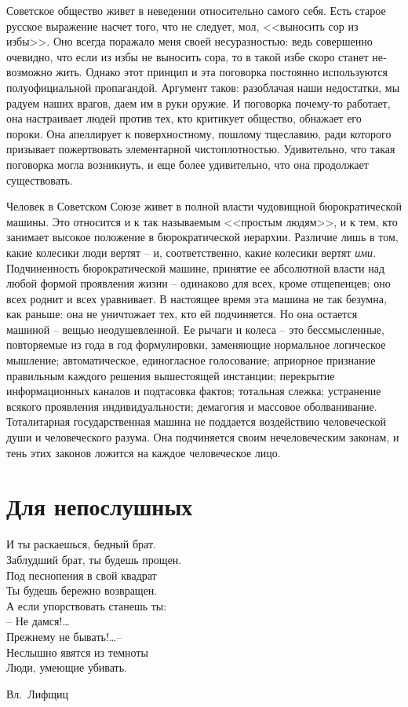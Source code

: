 \documentclass{book}
\begin{document}
Советское общество живет в неведении относительно самого себя. Есть старое русское выражение насчет того, что не следует, мол, 
<<выносить сор из избы>>. Оно всегда поражало меня своей несуразностью: ведь совершенно очевидно, что если из избы не выносить 
сора, то в такой избе скоро станет не­возможно жить. Однако этот принцип и эта поговорка постоянно используются полуофициальной 
пропагандой. Аргумент таков: разоблачая наши недостатки, мы радуем наших врагов, даем им в руки оружие. И поговорка почему-то 
работает, она настраивает людей против тех, кто критикует общество, обнажает его пороки. Она апеллирует к поверхностному, 
пошлому тщеславию, ради которого призывает пожертвовать элементарной чистоплотностью. Удивительно, что такая поговорка могла 
возникнуть, и еще более удивительно, что она продолжает существовать.

Человек в Советском Союзе живет в полной власти чудовищной бюрократической машины. Это относится и к так называемым <<простым 
людям>>, и к тем, кто занимает высокое положение в бюрократической иерархии. Различие лишь в том, какие колесики люди вертят -- 
и, соответственно, какие колесики вертят \textit{ими.}  Подчиненность бюрократической машине, принятие ее абсолютной власти над 
любой формой проявления жизни -- одинаково для всех, кроме отщепенцев; оно всех роднит и всех уравнивает. В настоящее время эта 
машина не так безумна, как раньше: она не уничтожает тех, кто ей подчиняется. Но она остается машиной -- вещью неодушевленной. 
Ее рычаги и колеса -- это бессмысленные, повторяемые из года в год формулировки, заменяющие нормальное логическое мышление; 
автоматическое, единогласное голосование; априорное признание правильным каждого решения вышестоящей инстанции; перекрытие 
информационных каналов и подтасовка фактов; тотальная слежка; устранение всякого проявле­ния индивидуальности; демагогия и 
массовое оболванивание. Тоталитарная государственная машина не поддается воздействию человеческой души и человеческого разума. 
Она подчиняется своим нечеловеческим законам, и тень этих законов ложится на каждое человеческое лицо.


\section{Для непослушных}

\epigraph{И ты раскаешься, бедный брат.\\
Заблудший брат, ты будешь прощен. \\
Под песнопения в свой квадрат\\
Ты будешь бережно возвращен. \\ 
А если упорствовать станешь ты:\\
-- Не дамся!\ldots\\
Прежнему не бывать!\ldots --\\ 
Неслышно явятся из темноты\\
Люди, умеющие убивать.}{Вл.~Лифщиц%
}
\end{document}
